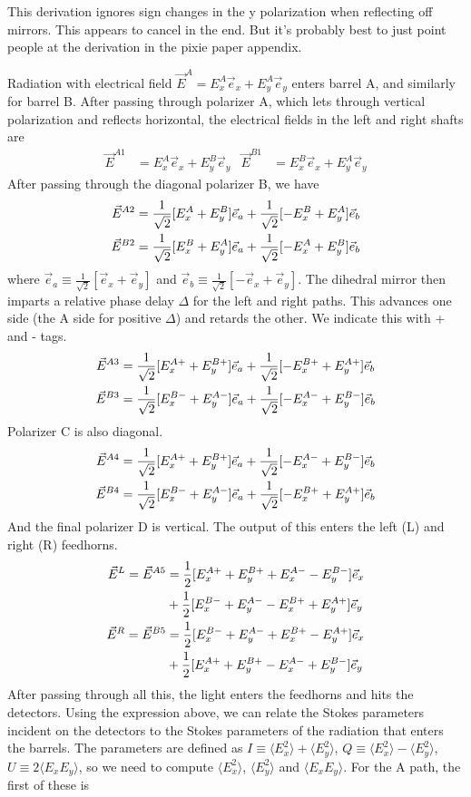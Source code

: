 \documentclass{article}
\newcommand{\rtwo}{\frac{1}{\sqrt{2}}}
\begin{document}
This derivation ignores sign changes in the y polarization when reflecting
off mirrors. This appears to cancel in the end. But it's probably best to just
point people at the derivation in the pixie paper appendix.

Radiation with electrical field $\vec E^A = E^A_x \vec e_x + E^A_y \vec e_y$
enters barrel A, and similarly for barrel B. After passing through polarizer
A, which lets through vertical polarization and reflects horizontal, the
electrical fields in the left and right shafts are
\begin{align}
	\vec E^{A1} &= E^A_x \vec e_x + E^B_y \vec e_y
& \vec E^{B1} &= E^B_x \vec e_x + E^A_y \vec e_y
\end{align}
After passing through the diagonal polarizer B, we have
\begin{align}
	\vec E^{A2} &= \rtwo [E^A_x+E^B_y]\vec e_a + \rtwo[-E^B_x+E^A_y]\vec e_b \notag \\
	\vec E^{B2} &= \rtwo [E^B_x+E^A_y]\vec e_a + \rtwo[-E^A_x+E^B_y]\vec e_b
\end{align}
where $\vec e_a \equiv \rtwo [\vec e_x + \vec e_y]$ and $\vec e_b
\equiv \rtwo [-\vec e_x + \vec e_y]$. The dihedral mirror then
imparts a relative phase delay $\Delta$ for the left and right paths.
This advances one side (the A side for positive $\Delta$) and
retards the other. We indicate this with + and - tags.
\begin{align}
	\vec E^{A3} &= \rtwo [E^{A+}_x+E^{B+}_y]\vec e_a + \rtwo[-E^{B+}_x+E^{A+}_y]\vec e_b \notag \\
	\vec E^{B3} &= \rtwo [E^{B-}_x+E^{A-}_y]\vec e_a + \rtwo[-E^{A-}_x+E^{B-}_y]\vec e_b
\end{align}
Polarizer C is also diagonal.
\begin{align}
	\vec E^{A4} &= \rtwo [E^{A+}_x+E^{B+}_y]\vec e_a + \rtwo[-E^{A-}_x+E^{B-}_y]\vec e_b \notag \\
	\vec E^{B4} &= \rtwo [E^{B-}_x+E^{A-}_y]\vec e_a + \rtwo[-E^{B+}_x+E^{A+}_y]\vec e_b
\end{align}
And the final polarizer D is vertical. The output of this enters
the left (L) and right (R) feedhorns.
\begin{align}
	\vec E^L = \vec E^{A5} &= \frac12 [E^{A+}_x+E^{B+}_y+E^{A-}_x-E^{B-}_y]\vec e_x \notag \\
		&+ \frac12 [E^{B-}_x+E^{A-}_y-E^{B+}_x+E^{A+}_y]\vec e_y \notag \\
	\vec E^R = \vec E^{B5} &= \frac12 [E^{B-}_x+E^{A-}_y+E^{B+}_x-E^{A+}_y]\vec e_x \notag \\
		&+ \frac12 [E^{A+}_x+E^{B+}_y-E^{A-}_x+E^{B-}_y]\vec e_y
\end{align}
After passing through all this, the light enters the feedhorns and
hits the detectors. Using the expression above, we can relate the
Stokes parameters incident on the detectors to the Stokes parameters
of the radiation that enters the barrels. The parameters are defined
as $I \equiv \langle E_x^2\rangle + \langle E_y^2\rangle$,
$Q \equiv \langle E_x^2\rangle - \langle E_y^2\rangle$,
$U \equiv 2\langle E_xE_y\rangle$, so we need to compute $\langle E_x^2\rangle$,
$\langle E_y^2\rangle$ and $\langle E_xE_y\rangle$. For the A path, the first of these is
\end{document}
